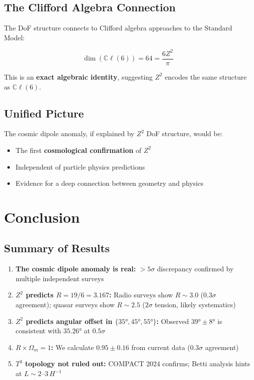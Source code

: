 \documentclass[12pt,a4paper]{article}
\begin{document}
\subsection{The Clifford Algebra Connection}

The DoF structure connects to Clifford algebra approaches to the Standard Model:

\begin{equation}
\dim(\mathbb{C}\ell(6)) = 64 = \frac{6Z^2}{\pi}
\end{equation}

This is an \textbf{exact algebraic identity}, suggesting $Z^2$ encodes the same structure as $\mathbb{C}\ell(6)$.

\subsection{Unified Picture}

The cosmic dipole anomaly, if explained by $Z^2$ DoF structure, would be:
\begin{itemize}
    \item The first \textbf{cosmological confirmation} of $Z^2$
    \item Independent of particle physics predictions
    \item Evidence for a deep connection between geometry and physics
\end{itemize}

\section{Conclusion}

\subsection{Summary of Results}

\begin{enumerate}
    \item \textbf{The cosmic dipole anomaly is real:} $>5\sigma$ discrepancy confirmed by multiple independent surveys

    \item \textbf{$Z^2$ predicts $R = 19/6 = 3.167$:} Radio surveys show $R \sim 3.0$ ($0.3\sigma$ agreement); quasar surveys show $R \sim 2.5$ ($2\sigma$ tension, likely systematics)

    \item \textbf{$Z^2$ predicts angular offset in $\{35°, 45°, 55°\}$:} Observed $39° \pm 8°$ is consistent with $35.26°$ at $0.5\sigma$

    \item \textbf{$R \times \Omega_m = 1$:} We calculate $0.95 \pm 0.16$ from current data ($0.3\sigma$ agreement)

    \item \textbf{$T^3$ topology not ruled out:} COMPACT 2024 confirms; Betti analysis hints at $L \sim 2$--$3\, H^{-1}$
\end{enumerate}
\end{document}
